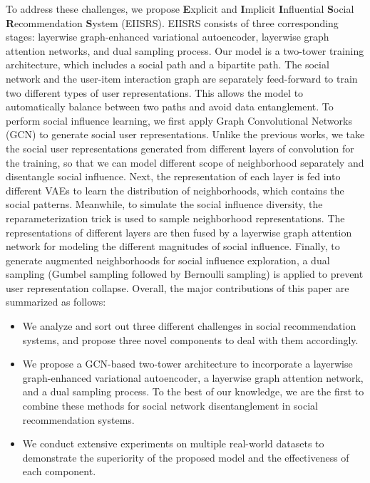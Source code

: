 \documentclass[letterpaper]{article} %
\begin{document}
To address these challenges, we propose \textbf{E}xplicit and \textbf{I}mplicit \textbf{I}nfluential \textbf{S}ocial \textbf{R}ecommendation \textbf{S}ystem (EIISRS). EIISRS consists of three corresponding stages: layerwise graph-enhanced variational autoencoder, layerwise graph attention networks, and dual sampling process. Our model is a two-tower training architecture, which includes a social path and a bipartite path. The social network and the user-item interaction graph are separately feed-forward to train two different types of user representations. This allows the model to automatically balance between two paths and avoid data entanglement. To perform social influence learning, we first apply Graph Convolutional Networks (GCN) to generate social user representations. Unlike the previous works, we take the social user representations generated from different layers of convolution for the training, so that we can model different scope of neighborhood separately and disentangle social influence. Next, the representation of each layer is fed into different VAEs to learn the distribution of neighborhoods, which contains the social patterns. Meanwhile, to simulate the social influence diversity, the reparameterization trick is used to sample neighborhood representations. The representations of different layers are then fused by a layerwise graph attention network for modeling the different magnitudes of social influence. Finally, to generate augmented neighborhoods for social influence exploration, a dual sampling (Gumbel sampling followed by Bernoulli sampling) is applied to prevent user representation collapse. Overall, the major contributions of this paper are summarized as follows:

\begin{itemize}
    \item We analyze and sort out three different challenges in social recommendation systems, and propose three novel components to deal with them accordingly.
    \item We propose a GCN-based two-tower architecture to incorporate a layerwise graph-enhanced variational autoencoder, a layerwise graph attention network, and a dual sampling process. To the best of our knowledge, we are the first to combine these methods for social network disentanglement in social recommendation systems. 
    \item We conduct extensive experiments on multiple real-world datasets to demonstrate the superiority of the proposed model and the effectiveness of each component. 
\end{itemize}
\end{document}
